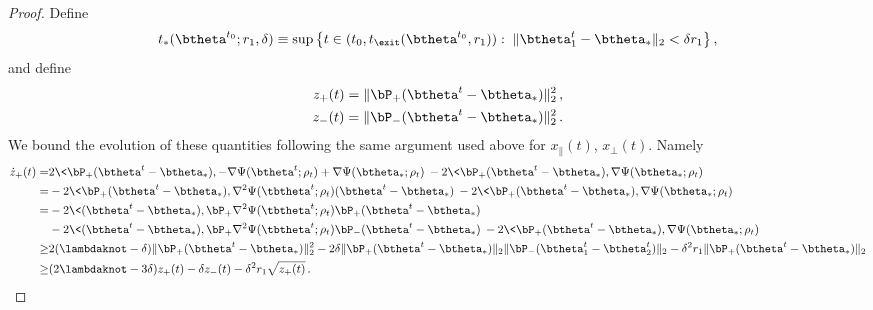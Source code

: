 \documentclass[11pt]{article}
\begin{document}
\begin{proof}
 
Define 
%
\begin{align}
t_*(\btheta^{t_0};r_1,\delta)\equiv\sup\big\{t\in (t_0,t_{\exit}(\btheta^{t_0},r_1)):\; \|\btheta_1^t-\btheta_*\|_2< \delta r_1\big\}\, ,
\end{align}
and define
\begin{align}
z_+(t) = \|\bP_+(\btheta^t-\btheta_*)\|_2^2\, ,\\
z_-(t) = \|\bP_-(\btheta^t-\btheta_*)\|_2^2\,.
\end{align}
We bound the evolution of these quantities following the same argument
used above for $x_{\parallel}(t)$, $x_{\perp}(t)$. Namely 
%
\begin{align*}
%
\dot{z}_+(t)=& 2\<\bP_+(\btheta^t-\btheta_*), -\nabla\Psi(\btheta^t;\rho_t) +\nabla\Psi(\btheta_*;\rho_t)\> - 2\<\bP_+(\btheta^t-\btheta_*),\nabla\Psi(\btheta_*;\rho_t)\>\\
=& - 2\<\bP_+(\btheta^t-\btheta_*), \nabla^2\Psi(\tbtheta^t;\rho_t)(\btheta^t-\btheta_*)\> - 2\<\bP_+(\btheta^t-\btheta_*), \nabla\Psi(\btheta_*;\rho_t)\>\\
 =& -2\<(\btheta^t-\btheta_*), \bP_+\nabla^2\Psi(\tbtheta^t;\rho_t) \bP_+(\btheta^t-\btheta_*)\>\\
&-2\<(\btheta^t-\btheta_*), \bP_+ \nabla^2\Psi(\tbtheta^t;\rho_t) \bP_-(\btheta^t-\btheta_*)\> - 2\<\bP_+(\btheta^t-\btheta_*), \nabla\Psi(\btheta_*;\rho_t)\>\\
\ge& 2(\lambdaknot-\delta) \| \bP_+(\btheta^t-\btheta_*)\|_2^2- 2 \delta \|\bP_+(\btheta^t-\btheta_*)\|_2 \|\bP_-(\btheta_1^t-\btheta^t_2)\|_2-\delta^2r_1 \|\bP_+(\btheta^t-\btheta_*)\|_2 \\
\ge& (2\lambdaknot-3\delta) z_+(t) -\delta z_-(t) -\delta^2 r_1\sqrt{z_+(t)}\, .
%
\end{align*}


\end{proof}
\end{document}
